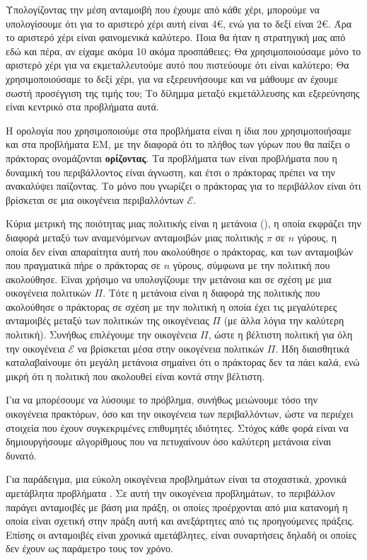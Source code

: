 Υπολογίζοντας την μέση ανταμοιβή που έχουμε από κάθε χέρι, μπορούμε να υπολογίσουμε ότι για το αριστερό χέρι αυτή είναι 4€, ενώ για το δεξί είναι 2€. Άρα το αριστερό χέρι είναι φαινομενικά καλύτερο. Ποια θα ήταν η στρατηγική μας από εδώ και πέρα, αν είχαμε ακόμα 10 ακόμα προσπάθειες; Θα χρησιμοποιούσαμε μόνο το αριστερό χέρι για να εκμεταλλευτούμε αυτό που πιστεύουμε ότι είναι καλύτερο; Θα χρησιμοποιούσαμε το δεξί χέρι, για να εξερευνήσουμε και να μάθουμε αν έχουμε σωστή προσέγγιση της τιμής του; Το δίλημμα μεταξύ εκμετάλλευσης και εξερεύνησης είναι κεντρικό στα προβλήματα αυτά.

Η ορολογία που χρησιμοποιούμε στα προβλήματα  είναι η ίδια που χρησιμοποιήσαμε και στα προβλήματα ΕΜ, με την διαφορά ότι το πλήθος των γύρων που θα παίξει ο πράκτορας ονομάζονται \textbf{ορίζοντας}. Τα προβλήματα των  είναι προβλήματα που η δυναμική του περιβάλλοντος είναι άγνωστη, και έτσι ο πράκτορας πρέπει να την ανακαλύψει παίζοντας. Το μόνο που γνωρίζει ο πράκτορας για το περιβάλλον είναι ότι βρίσκεται σε μια οικογένεια περιβαλλόντων $\mathcal{E}$.

Κύρια μετρική της ποιότητας μιας πολιτικής είναι η μετάνοια (), η οποία εκφράζει την διαφορά μεταξύ των αναμενόμενων ανταμοιβών μιας πολιτικής $π$ σε $n$ γύρους, η οποία δεν είναι απαραίτητα αυτή που ακολούθησε ο πράκτορας, και των ανταμοιβών που πραγματικά πήρε ο πράκτορας σε $n$ γύρους, σύμφωνα με την πολιτική που ακολούθησε. Είναι χρήσιμο να υπολογίζουμε την μετάνοια και σε σχέση με μια οικογένεια πολιτικών $Π$. Τότε η μετάνοια είναι η διαφορά της πολιτικής που ακολούθησε ο πράκτορας σε σχέση με την πολιτική η οποία έχει τις μεγαλύτερες ανταμοιβές μεταξύ των πολιτικών της οικογένειας $Π$ (με άλλα λόγια την καλύτερη πολιτική). Συνήθως επιλέγουμε την οικογένεια $Π$, ώστε η βέλτιστη πολιτική για όλη την οικογένεια $\mathcal{E}$ να βρίσκεται μέσα στην οικογένεια πολιτικών $Π$. Ήδη διαισθητικά καταλαβαίνουμε ότι μεγάλη μετάνοια σημαίνει ότι ο πράκτορας δεν τα πάει καλά, ενώ μικρή ότι η πολιτική που ακολουθεί είναι κοντά στην βέλτιστη.

Για να μπορέσουμε να λύσουμε το πρόβλημα, συνήθως μειώνουμε τόσο την οικογένεια πρακτόρων, όσο και την οικογένεια των περιβαλλόντων, ώστε να περιέχει στοιχεία που έχουν συγκεκριμένες επιθυμητές ιδιότητες. Στόχος κάθε φορά είναι να δημιουργήσουμε αλγορίθμους που να πετυχαίνουν όσο καλύτερη μετάνοια είναι δυνατό.

Για παράδειγμα, μια εύκολη οικογένεια προβλημάτων είναι τα στοχαστικά, χρονικά αμετάβλητα προβλήματα . Σε αυτή την οικογένεια προβλημάτων, το περιβάλλον παράγει ανταμοιβές με βάση μια πράξη, οι οποίες προέρχονται από μια κατανομή η οποία είναι σχετική στην πράξη αυτή και ανεξάρτητες από τις προηγούμενες πράξεις. Επίσης οι ανταμοιβές είναι χρονικά αμετάβλητες, είναι συναρτήσεις δηλαδή οι οποίες δεν έχουν ως παράμετρο τους τον χρόνο.

